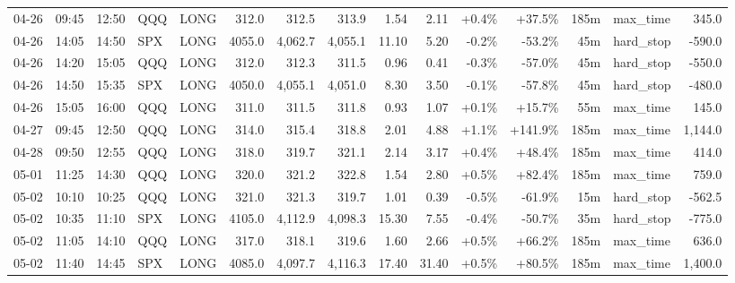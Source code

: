 \documentclass[11pt,a4paper,twoside]{article}
\begin{document}
\begin{landscape}
\begin{center}
\begin{longtable}{>{\color{txtmain}}l l l l l r r r r r r r r >{\color{txtmain}}l r}
04-26 & 09:45 & 12:50 & QQQ & LONG & 312.0 & 312.5 & 313.9 & 1.54 & 2.11 & \textcolor{wingreen}{+0.4\%} & \textcolor{wingreen}{+37.5\%} & 185m & max\_time & \textcolor{wingreen}{345.0} \\
04-26 & 14:05 & 14:50 & SPX & LONG & 4055.0 & 4,062.7 & 4,055.1 & 11.10 & 5.20 & \textcolor{lossred}{-0.2\%} & \textcolor{lossred}{-53.2\%} & 45m & hard\_stop & \textcolor{lossred}{-590.0} \\
04-26 & 14:20 & 15:05 & QQQ & LONG & 312.0 & 312.3 & 311.5 & 0.96 & 0.41 & \textcolor{lossred}{-0.3\%} & \textcolor{lossred}{-57.0\%} & 45m & hard\_stop & \textcolor{lossred}{-550.0} \\
04-26 & 14:50 & 15:35 & SPX & LONG & 4050.0 & 4,055.1 & 4,051.0 & 8.30 & 3.50 & \textcolor{lossred}{-0.1\%} & \textcolor{lossred}{-57.8\%} & 45m & hard\_stop & \textcolor{lossred}{-480.0} \\
04-26 & 15:05 & 16:00 & QQQ & LONG & 311.0 & 311.5 & 311.8 & 0.93 & 1.07 & \textcolor{wingreen}{+0.1\%} & \textcolor{wingreen}{+15.7\%} & 55m & max\_time & \textcolor{wingreen}{145.0} \\
04-27 & 09:45 & 12:50 & QQQ & LONG & 314.0 & 315.4 & 318.8 & 2.01 & 4.88 & \textcolor{wingreen}{+1.1\%} & \textcolor{wingreen}{+141.9\%} & 185m & max\_time & \textcolor{wingreen}{1,144.0} \\
04-28 & 09:50 & 12:55 & QQQ & LONG & 318.0 & 319.7 & 321.1 & 2.14 & 3.17 & \textcolor{wingreen}{+0.4\%} & \textcolor{wingreen}{+48.4\%} & 185m & max\_time & \textcolor{wingreen}{414.0} \\
05-01 & 11:25 & 14:30 & QQQ & LONG & 320.0 & 321.2 & 322.8 & 1.54 & 2.80 & \textcolor{wingreen}{+0.5\%} & \textcolor{wingreen}{+82.4\%} & 185m & max\_time & \textcolor{wingreen}{759.0} \\
05-02 & 10:10 & 10:25 & QQQ & LONG & 321.0 & 321.3 & 319.7 & 1.01 & 0.39 & \textcolor{lossred}{-0.5\%} & \textcolor{lossred}{-61.9\%} & 15m & hard\_stop & \textcolor{lossred}{-562.5} \\
05-02 & 10:35 & 11:10 & SPX & LONG & 4105.0 & 4,112.9 & 4,098.3 & 15.30 & 7.55 & \textcolor{lossred}{-0.4\%} & \textcolor{lossred}{-50.7\%} & 35m & hard\_stop & \textcolor{lossred}{-775.0} \\
05-02 & 11:05 & 14:10 & QQQ & LONG & 317.0 & 318.1 & 319.6 & 1.60 & 2.66 & \textcolor{wingreen}{+0.5\%} & \textcolor{wingreen}{+66.2\%} & 185m & max\_time & \textcolor{wingreen}{636.0} \\
05-02 & 11:40 & 14:45 & SPX & LONG & 4085.0 & 4,097.7 & 4,116.3 & 17.40 & 31.40 & \textcolor{wingreen}{+0.5\%} & \textcolor{wingreen}{+80.5\%} & 185m & max\_time & \textcolor{wingreen}{1,400.0} \\

\end{longtable}
\end{center}
\end{landscape}
\end{document}
